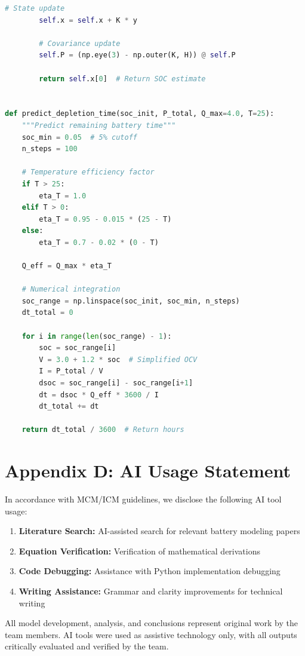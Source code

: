 \begin{lstlisting}[language=Python]
        # State update
        self.x = self.x + K * y
        
        # Covariance update
        self.P = (np.eye(3) - np.outer(K, H)) @ self.P
        
        return self.x[0]  # Return SOC estimate


def predict_depletion_time(soc_init, P_total, Q_max=4.0, T=25):
    """Predict remaining battery time"""
    soc_min = 0.05  # 5% cutoff
    n_steps = 100
    
    # Temperature efficiency factor
    if T > 25:
        eta_T = 1.0
    elif T > 0:
        eta_T = 0.95 - 0.015 * (25 - T)
    else:
        eta_T = 0.7 - 0.02 * (0 - T)
    
    Q_eff = Q_max * eta_T
    
    # Numerical integration
    soc_range = np.linspace(soc_init, soc_min, n_steps)
    dt_total = 0
    
    for i in range(len(soc_range) - 1):
        soc = soc_range[i]
        V = 3.0 + 1.2 * soc  # Simplified OCV
        I = P_total / V
        dsoc = soc_range[i] - soc_range[i+1]
        dt = dsoc * Q_eff * 3600 / I
        dt_total += dt
    
    return dt_total / 3600  # Return hours
\end{lstlisting}

\section*{Appendix D: AI Usage Statement}

In accordance with MCM/ICM guidelines, we disclose the following AI tool usage:

\begin{enumerate}
    \item \textbf{Literature Search:} AI-assisted search for relevant battery modeling papers
    \item \textbf{Equation Verification:} Verification of mathematical derivations
    \item \textbf{Code Debugging:} Assistance with Python implementation debugging
    \item \textbf{Writing Assistance:} Grammar and clarity improvements for technical writing
\end{enumerate}

All model development, analysis, and conclusions represent original work by the team members. AI tools were used as assistive technology only, with all outputs critically evaluated and verified by the team.
